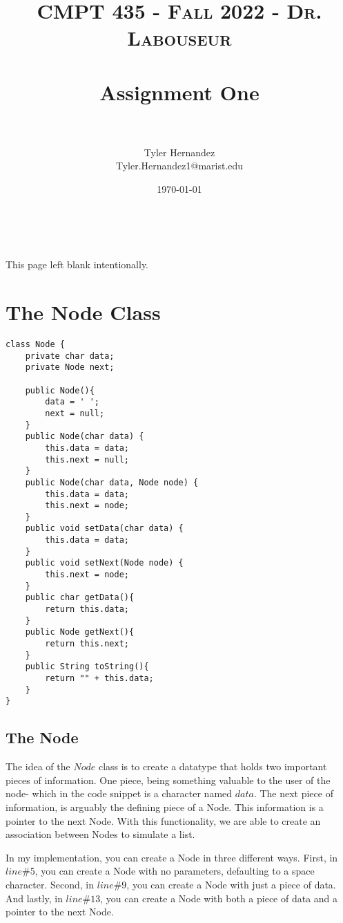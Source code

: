 \documentclass[letterpaper, 10pt,DIV=13]{scrartcl}
\title{	
   \normalfont \normalsize 
   \textsc{CMPT 435 - Fall 2022 - Dr. Labouseur} \\[10pt] %
   \horrule{0.5pt} \\[0.25cm] 	%
   \huge Assignment One  \\     	    %
   \horrule{0.5pt} \\[0.25cm] 	%
}
\author{Tyler Hernandez \\ \normalsize Tyler.Hernandez1@marist.edu}
\date{\normalsize\today} 	%
\numberwithin{equation}{section} %
\numberwithin{figure}{section} %
\numberwithin{table}{section} %
\begin{document}
\maketitle %

\ 
\ 
\ 
\begin{center}
    This page left blank intentionally.
\end{center}

\pagebreak

\section{The Node Class}

\lstset{numbers=left, numberstyle=\tiny, stepnumber=1, numbersep=5pt, basicstyle=\footnotesize\ttfamily}
\begin{lstlisting}[frame=single, ]  
class Node {
    private char data;
    private Node next;

    public Node(){
        data = ' ';
        next = null;
    }
    public Node(char data) {
        this.data = data;
        this.next = null;
    }
    public Node(char data, Node node) {
        this.data = data;
        this.next = node;
    }
    public void setData(char data) {
        this.data = data;
    }
    public void setNext(Node node) {
        this.next = node;
    }
    public char getData(){
        return this.data;
    }
    public Node getNext(){
        return this.next;
    }
    public String toString(){
        return "" + this.data;
    }
}
\end{lstlisting}

\subsection{The Node}
The idea of the $Node$ class is to create a datatype that holds two important pieces of information. One piece, being something valuable to the user of the node- which in the code snippet is a character named $data$. The next piece of information, is arguably the defining piece of a Node. This information is a pointer to the next Node. With this functionality, we are able to create an association between Nodes to simulate a list.

In my implementation, you can create a Node in three different ways. First, in $line\#5$, you can create a Node with no parameters, defaulting to a space character. Second, in $line\#9$, you can create a Node with just a piece of data. And lastly, in $line\#13$, you can create a Node with both a piece of data and a pointer to the next Node.
\end{document}
